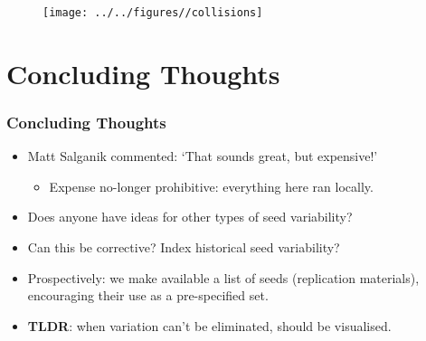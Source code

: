 \documentclass[12pt]{beamer}
\begin{document}
\begin{frame}
\begin{center}
\begin{figure}
\texttt{[image: ../../figures//collisions]} \\ \vspace{.025in}
\end{figure}
\end{center}
\end{frame}


\section{Concluding Thoughts}
\begin{frame}
\frametitle{Concluding Thoughts}
\begin{itemize}
\item Matt Salganik commented: `That sounds great, but expensive!'\\ \vspace{.1in}
\begin{itemize}
\item Expense no-longer prohibitive: everything here ran locally.\\ \vspace{.1in}
\end{itemize}
\item Does anyone have ideas for other types of seed variability?\\ \vspace{.1in}

\item Can this be corrective? Index historical seed variability?\\ \vspace{.1in}

\item Prospectively: we make available a list of seeds (replication materials), encouraging their use as a pre-specified set.\\ \vspace{.1in}

\item \textbf{TLDR}: when variation can't be eliminated, should be visualised.


\end{itemize}
\end{frame}
\end{document}
